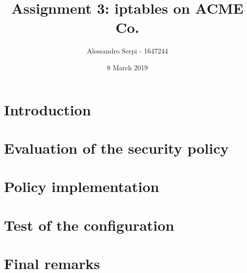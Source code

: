 \documentclass[draft]{homework}
\title{Assignment 3: iptables on ACME Co.}
\author{Alessandro Serpi - 1647244}
\date{8 March 2019}
\begin{document}
    \maketitle
    \tableofcontents
    
    \pagebreak
    \section{Introduction}
    
    
    \section{Evaluation of the security policy}
    
    
    \section{Policy implementation}
    
    
    \section{Test of the configuration}
    
    
    \section{Final remarks}
\end{document}
